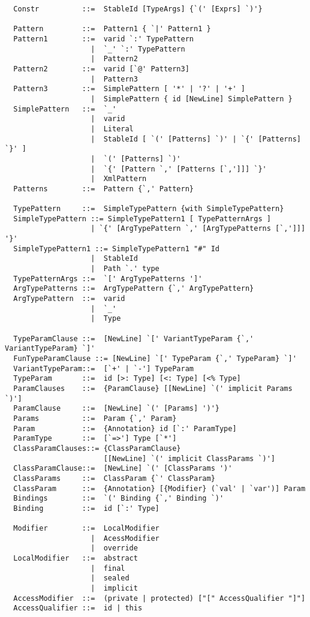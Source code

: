 \begin{lstlisting}
  Constr          ::=  StableId [TypeArgs] {`(' [Exprs] `)'}

  Pattern         ::=  Pattern1 { `|' Pattern1 }
  Pattern1        ::=  varid `:' TypePattern
                    |  `_' `:' TypePattern
                    |  Pattern2
  Pattern2        ::=  varid [`@' Pattern3]
                    |  Pattern3
  Pattern3        ::=  SimplePattern [ '*' | '?' | '+' ]
                    |  SimplePattern { id [NewLine] SimplePattern }
  SimplePattern   ::=  `_'
                    |  varid
                    |  Literal
                    |  StableId [ `(' [Patterns] `)' | `{' [Patterns] `}' ]
                    |  `(' [Patterns] `)'
                    |  `{' [Pattern `,' [Patterns [`,']]] `}'
                    |  XmlPattern
  Patterns        ::=  Pattern {`,' Pattern}

  TypePattern     ::=  SimpleTypePattern {with SimpleTypePattern}
  SimpleTypePattern ::= SimpleTypePattern1 [ TypePatternArgs ]
                    | `{' [ArgTypePattern `,' [ArgTypePatterns [`,']]] '}'
  SimpleTypePattern1 ::= SimpleTypePattern1 "#" Id
                    |  StableId 
                    |  Path `.' type 
  TypePatternArgs ::=  `[' ArgTypePatterns ']'
  ArgTypePatterns ::=  ArgTypePattern {`,' ArgTypePattern}
  ArgTypePattern  ::=  varid 
                    |  `_' 
                    |  Type

  TypeParamClause ::=  [NewLine] `[' VariantTypeParam {`,' VariantTypeParam} `]'
  FunTypeParamClause ::= [NewLine] `[' TypeParam {`,' TypeParam} `]'
  VariantTypeParam::=  [`+' | `-'] TypeParam
  TypeParam       ::=  id [>: Type] [<: Type] [<% Type]
  ParamClauses    ::=  {ParamClause} [[NewLine] `(' implicit Params `)']
  ParamClause     ::=  [NewLine] `(' [Params] ')'} 
  Params          ::=  Param {`,' Param}
  Param           ::=  {Annotation} id [`:' ParamType]
  ParamType       ::=  [`=>'] Type [`*']
  ClassParamClauses::= {ClassParamClause} 
                       [[NewLine] `(' implicit ClassParams `)']
  ClassParamClause::=  [NewLine] `(' [ClassParams ')'
  ClassParams     ::=  ClassParam {`' ClassParam}
  ClassParam      ::=  {Annotation} [{Modifier} (`val' | `var')] Param
  Bindings        ::=  `(' Binding {`,' Binding `)'
  Binding         ::=  id [`:' Type]

  Modifier        ::=  LocalModifier 
                    |  AcessModifier
                    |  override
  LocalModifier   ::=  abstract
                    |  final
                    |  sealed
                    |  implicit
  AccessModifier  ::=  (private | protected) ["[" AccessQualifier "]"]
  AccessQualifier ::=  id | this


\end{lstlisting}

